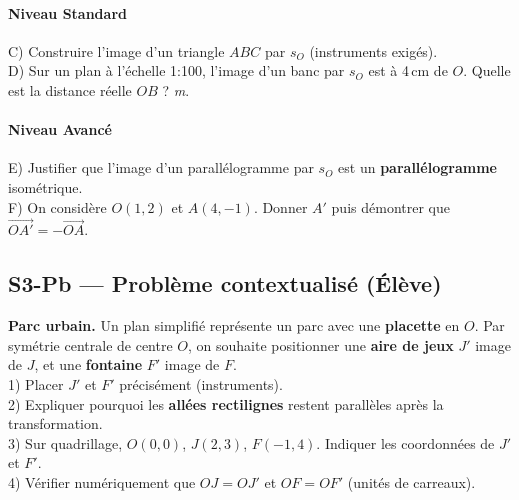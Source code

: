 \paragraph{Niveau Standard}
\begin{exercice}
	C) Construire l’image d’un triangle $ABC$ par $s_O$ (instruments exigés).\\
	D) Sur un plan à l’échelle 1:100, l’image d’un banc par $s_O$ est à 4\,cm de $O$. Quelle est la distance réelle $OB$ ? \trous{2cm} \textit{m}.
\end{exercice}

\paragraph{Niveau Avancé}
\begin{exercice}
	E) Justifier que l’image d’un parallélogramme par $s_O$ est un \textbf{parallélogramme} isométrique.\\
	F) On considère $O(1,2)$ et $A(4,{-}1)$. Donner $A'$ puis démontrer que $\overrightarrow{OA'}=-\overrightarrow{OA}$.
\end{exercice}

\subsection*{S3-Pb — Problème contextualisé (Élève)}
\begin{exercice}
	\textbf{Parc urbain.} Un plan simplifié représente un parc avec une \textbf{placette} en $O$. Par symétrie centrale de centre $O$, on souhaite positionner une \textbf{aire de jeux} $J'$ image de $J$, et une \textbf{fontaine} $F'$ image de $F$. \\
	1) Placer $J'$ et $F'$ précisément (instruments). \\
	2) Expliquer pourquoi les \textbf{allées rectilignes} restent parallèles après la transformation. \\
	3) Sur quadrillage, $O(0,0)$, $J(2,3)$, $F(-1,4)$. Indiquer les coordonnées de $J'$ et $F'$. \\
	4) Vérifier numériquement que $OJ=OJ'$ et $OF=OF'$ (unités de carreaux).
\end{exercice}

